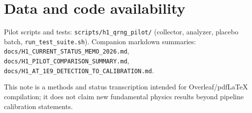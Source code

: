 \documentclass[reprint,amsmath,amssymb,aps,showkeys]{revtex4-2}
\begin{document}
\section*{Data and code availability}
Pilot scripts and tests: \texttt{scripts/h1\_qrng\_pilot/} (collector, analyzer, placebo batch, \texttt{run\_test\_suite.sh}). Companion markdown summaries: \texttt{docs/H1\_CURRENT\_STATUS\_MEMO\_2026.md}, \texttt{docs/H1\_PILOT\_COMPARISON\_SUMMARY.md}, \texttt{docs/H1\_AT\_1E9\_DETECTION\_TO\_CALIBRATION.md}.

\begin{acknowledgments}
This note is a methods and status transcription intended for Overleaf/pdfLaTeX compilation; it does not claim new fundamental physics results beyond pipeline calibration statements.
\end{acknowledgments}
\end{document}
